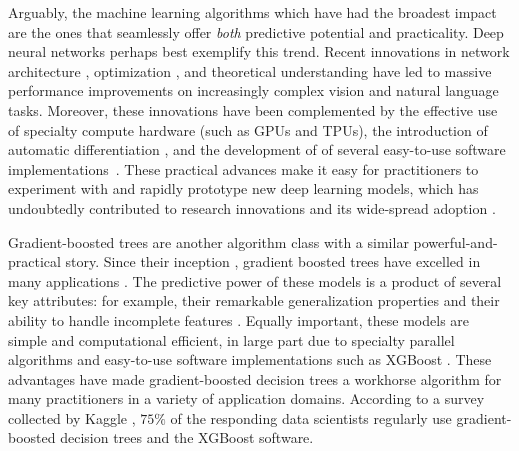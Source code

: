 Arguably, the machine learning algorithms which have had the broadest impact are the ones that seamlessly offer \emph{both} predictive potential and practicality.
Deep neural networks perhaps best exemplify this trend.
Recent innovations in
network architecture \citep[e.g.][]{krizhevsky2012imagenet,he2016deep,vaswani2017attention,devlin2018bert,huang2019convolutional},
optimization \citep[e.g.][]{hochreiter1997flat,ioffe2015batch,izmailov2018averaging},
and theoretical understanding \citep[e.g.][]{keskar2016large,jacot2018neural,arora2019fine}
have led to massive performance improvements on increasingly complex vision and natural language tasks.
Moreover, these innovations have been complemented by
the effective use of specialty compute hardware (such as GPUs and TPUs),
the introduction of automatic differentiation \citep[e.g.][]{paszke2017automatic},
and the development of of several easy-to-use software implementations~\citep[e.g.][]{jia2014caffe,chen2015mxnet,abadi2016tensorflow,paszke2019pytorch}.
These practical advances make it easy for practitioners to experiment with and rapidly prototype new deep learning models, which has undoubtedly contributed to research innovations and its wide-spread adoption \cite{goodfellow2016deep}.

Gradient-boosted trees are another algorithm class with a similar powerful-and-practical story.
Since their inception \cite{friedman2001greedy,friedman2002stochastic}, gradient boosted trees have excelled in many applications \citep[e.g.][]{richardson2007predicting,burges2010ranknet,li2010robust}.
The predictive power of these models is a product of several key attributes: for example, their remarkable generalization properties \citep{freund1997decision,schapire2013boosting} and their ability to handle incomplete features \cite{friedman2001greedy}.
Equally important, these models are simple and computational efficient, in large part due to specialty parallel algorithms \citep[e.g.][]{panda2009planet,tyree2011parallel,ke2017lightgbm} and easy-to-use software implementations such as XGBoost \cite{chen2016xgboost}.
These advantages have made gradient-boosted decision trees a workhorse algorithm for many practitioners in a variety of application domains.
According to a survey collected by Kaggle \cite{kaggle2019kaggle}, $75\%$ of the responding data scientists regularly use gradient-boosted decision trees and the XGBoost software.

